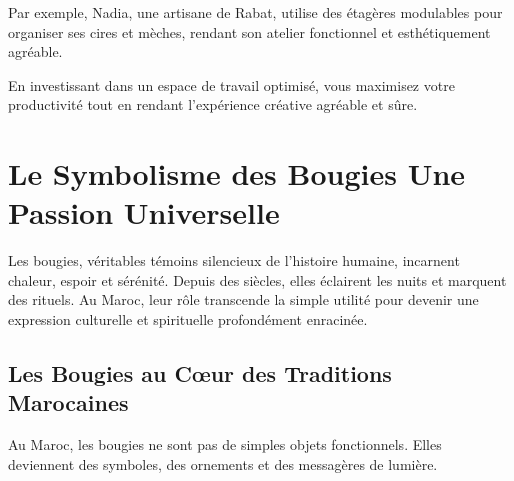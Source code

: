 \documentclass[11pt,fleqn,onecolumn,oneside]{book}
\begin{document}
\begin{example}
Par exemple, Nadia, une artisane de Rabat, utilise des étagères modulables pour organiser ses cires et mèches, rendant son atelier fonctionnel et esthétiquement agréable.
\end{example}

\noindent
En investissant dans un espace de travail optimisé, vous maximisez votre productivité tout en rendant l’expérience créative agréable et sûre.

\section{Le Symbolisme des Bougies Une Passion Universelle}

\begin{definition}
Les bougies, véritables témoins silencieux de l’histoire humaine, incarnent chaleur, espoir et sérénité. Depuis des siècles, elles éclairent les nuits et marquent des rituels. Au Maroc, leur rôle transcende la simple utilité pour devenir une expression culturelle et spirituelle profondément enracinée.
\end{definition}

\subsection*{Les Bougies au Cœur des Traditions Marocaines}

\begin{remark}
Au Maroc, les bougies ne sont pas de simples objets fonctionnels. Elles deviennent des symboles, des ornements et des messagères de lumière.
\end{remark}
\end{document}
